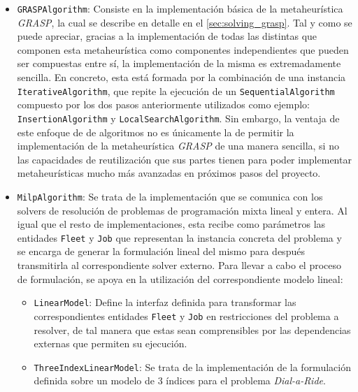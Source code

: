 \documentclass{subfiles}
\begin{document}
\begin{itemize}
              \item \texttt{GRASPAlgorithm}: Consiste en la implementación básica de la metaheurística \emph{GRASP}, la cual se describe en detalle en el \cref{sec:solving_grasp}. Tal y como se puede apreciar, gracias a la implementación de todas las distintas  que componen esta metaheurística como componentes independientes que pueden ser compuestas entre sí, la implementación de la misma es extremadamente sencilla. En concreto, esta está formada por la combinación de una instancia \texttt{IterativeAlgorithm}, que repite la ejecución de un \texttt{SequentialAlgorithm} compuesto por los dos pasos anteriormente utilizados como ejemplo: \texttt{InsertionAlgorithm} y \texttt{LocalSearchAlgorithm}. Sin embargo, la ventaja de este enfoque de  de algoritmos no es únicamente la de permitir la implementación de la metaheurística \emph{GRASP} de una manera sencilla, si no las capacidades de reutilización que sus partes tienen para poder implementar metaheurísticas mucho más avanzadas en próximos pasos del proyecto.

              \item \texttt{MilpAlgorithm}: Se trata de la implementación que se comunica con los solvers de resolución de problemas de programación mixta lineal y entera. Al igual que el resto de implementaciones, esta recibe como parámetros las entidades \texttt{Fleet} y \texttt{Job} que representan la instancia concreta del problema y se encarga de generar la formulación lineal del mismo para después transmitirla al correspondiente solver externo. Para llevar a cabo el proceso de formulación, se apoya en la utilización del correspondiente modelo lineal:

                  \begin{itemize}

                      \item \texttt{LinearModel}: Define la interfaz definida para transformar las correspondientes entidades \texttt{Fleet} y \texttt{Job} en restricciones del problema a resolver, de tal manera que estas sean comprensibles por las dependencias externas que permiten su ejecución.

                      \item \texttt{ThreeIndexLinearModel}: Se trata de la implementación de la formulación definida sobre un modelo de 3 índices para el problema \emph{Dial-a-Ride}.

                  \end{itemize}

          \end{itemize}
\end{document}

